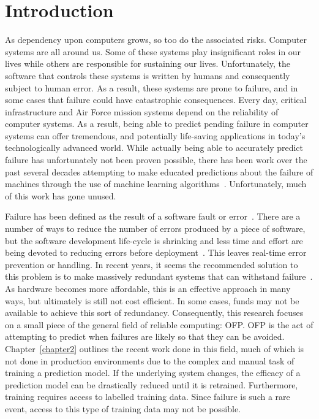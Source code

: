 \chapter{Introduction} \label{chapter1}
As dependency upon computers grows, so too do the associated risks.  Computer
systems are all around us.  Some of these systems play insignificant
roles in our lives while others are responsible for sustaining our lives.
Unfortunately, the software that controls these systems is written by humans
and consequently subject to human error.  As a result, these systems are prone
to failure, and in some cases that failure could have catastrophic
consequences.  Every day, critical infrastructure and Air Force mission systems
depend on the reliability of computer systems.  As a result, being able to
predict pending failure in computer systems can offer tremendous, and
potentially life-saving applications in today's technologically advanced world.
While actually being able to accurately predict failure has unfortunately not
been proven possible, there has been work over the past several decades
attempting to make educated predictions about the failure of machines through
the use of machine learning algorithms~\cite{salfnerSurvey}.  Unfortunately,
much of this work has gone unused.  

Failure has been defined as the result of a software fault or
error~\cite{salfnerSurvey}.  There are a number of ways to reduce the number of
errors produced by a piece of software, but the software development life-cycle
is shrinking and less time and effort are being devoted to reducing errors
before deployment~\cite{schmidt2016}.  This leaves real-time error prevention
or handling.  In recent years, it seems the recommended solution to this
problem is to make massively redundant systems that can withstand
failure~\cite{bauer2012}.  As hardware becomes more affordable, this is an
effective approach in many ways, but ultimately is still not cost efficient.
In some cases, funds may not be available to achieve this sort of redundancy.
Consequently, this research focuses on a small piece of the general field of
reliable computing: \ac{OFP}.  \ac{OFP} is the act of attempting to predict
when failures are likely so that they can be avoided.  Chapter~\ref{chapter2}
outlines the recent work done in this field, much of which is not done in
production environments due to the complex and manual task of training a
prediction model.  If the underlying system changes, the efficacy of a
prediction model can be drastically reduced until it is retrained.
Furthermore, training requires access to labelled training data.  Since failure
is such a rare event, access to this type of training data may not be possible.  

